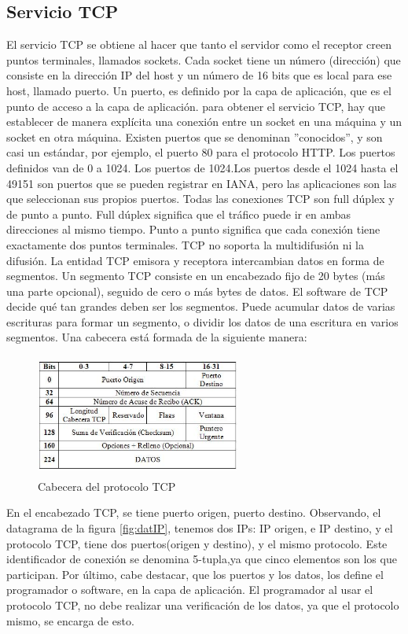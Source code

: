 \subsection{Servicio TCP}
	El servicio TCP se obtiene al hacer que tanto el servidor como el receptor creen puntos terminales, llamados sockets. Cada socket tiene un número (dirección) que consiste en la dirección IP del host y un número de 16 bits que es local para ese host, llamado puerto. Un puerto, es definido por la capa de aplicación, que es el punto de acceso a la capa de aplicación. para obtener el servicio TCP, hay que establecer de manera explícita una conexión entre un socket en una máquina y un socket en otra máquina. 
	Existen puertos que se denominan ''conocidos'', y son casi un estándar, por ejemplo, el puerto 80 para el protocolo HTTP. Los puertos definidos van de 0 a 1024. Los puertos de 1024.Los puertos desde el 1024 hasta el 49151 son puertos que se pueden registrar en IANA, pero las aplicaciones son las que seleccionan sus propios puertos.  
	Todas las conexiones TCP son full dúplex y de punto a punto. Full dúplex significa que el tráfico puede 	ir en ambas direcciones al mismo tiempo. Punto a punto significa que cada conexión tiene exactamente dos puntos terminales. TCP no soporta la multidifusión ni la difusión. 
	La entidad TCP emisora y receptora intercambian datos en forma de segmentos. Un segmento TCP consiste en un encabezado fijo de 20 bytes (más una parte opcional), seguido de cero o más bytes de datos. El software de TCP decide qué tan grandes deben ser los segmentos. Puede acumular datos de varias escrituras para formar un segmento, o dividir los datos de una escritura en varios segmentos. Una cabecera está formada de la siguiente manera: 
	\begin{figure}[ht]
		\centering 
		\includegraphics[height=4cm,width=0.6\textwidth]{parte_2/redes/cabecera-tcp} 
		\caption{Cabecera del protocolo TCP}
	\end{figure}

	En el encabezado TCP, se tiene puerto origen, puerto destino. Observando, el datagrama de la figura \ref{fig:datIP}, tenemos dos IPs: IP origen, e IP destino, y el protocolo TCP, tiene dos puertos(origen y destino), y el mismo protocolo. Este identificador de conexión se denomina 5-tupla,ya que cinco elementos son los que participan. 
	Por último, cabe destacar, que los puertos y los datos, los define el programador o software, en la capa de aplicación. El programador al usar el protocolo TCP, no debe realizar una verificación de los datos, ya que el protocolo mismo, se encarga de esto. 
	
